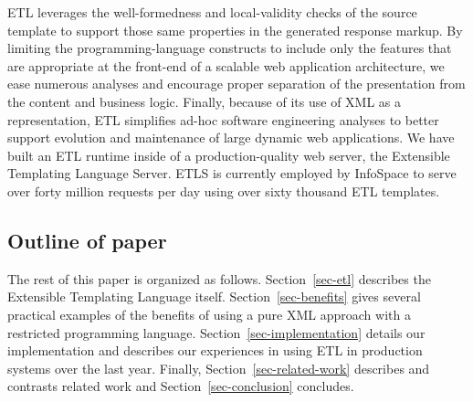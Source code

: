 \documentclass{www2003-submission}
\newcommand{\secref}[1]{Section~\ref{sec-#1}}
\begin{document}
ETL leverages the well-formedness and local-validity checks of the
source template to support those same properties in the generated
response markup.  By limiting the programming-language constructs to
include only the features that are appropriate at the front-end of a
scalable web application architecture, we ease numerous analyses and
encourage proper separation of the presentation from the content and
business logic. Finally, because of its use of XML as a
representation, ETL simplifies ad-hoc software engineering analyses to
better support evolution and maintenance of large dynamic web
applications.  We have built an ETL runtime inside of a
production-quality web server, the Extensible Templating Language
Server.  ETLS is currently employed by InfoSpace to serve over forty
million requests per day using over sixty thousand ETL templates.

\subsection{Outline of paper}

The rest of this paper is organized as follows. \secref{etl} describes
the Extensible Templating Language itself. \secref{benefits} gives
several practical examples of the benefits of using a pure XML
approach with a restricted programming language.
\secref{implementation} details our implementation and
describes our experiences in using ETL in production systems over the
last year.  Finally, \secref{related-work} describes and contrasts
related work and \secref{conclusion} concludes.





\end{document}

